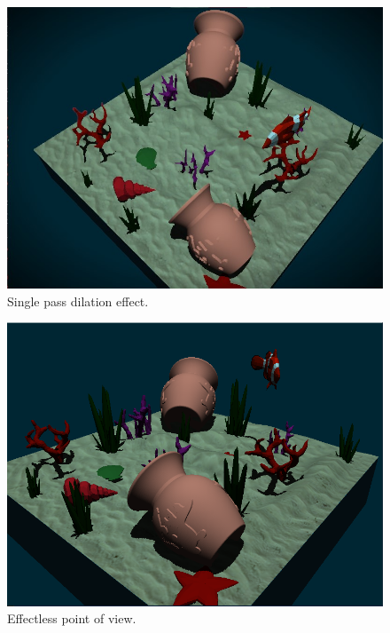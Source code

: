\documentclass{article}
\begin{document}
\vspace{5em}

\begin{figure}[h]
    \centering
    \includegraphics[width=\columnwidth]{imgs/dilation.jpg}
    \caption{Single pass dilation effect.}
    \label{fig:dilation_ms}
\end{figure}

\newpage

\begin{figure}[h]
    \centering
    \includegraphics[width=\columnwidth]{imgs/bright_sides.png}
    \caption{Effectless point of view.}
    \label{fig:no_blur}
\end{figure}
\end{document}
